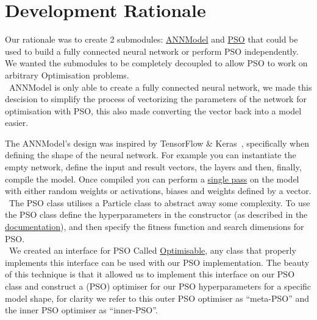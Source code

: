 \documentclass[11pt]{article}
\begin{document}
\section{Development Rationale}
Our rationale was to create 2 submodules: \href{https://www2.macs.hw.ac.uk/~sf52/Bio-Comp-docs/html/Coursework.ANNModel.html}{ANNModel} and \href{https://www2.macs.hw.ac.uk/~sf52/Bio-Comp-docs/html/Coursework.PSO.html}{PSO} that could be used to build a fully connected neural network or perform PSO independently.
We wanted the submodules to be completely decoupled to allow PSO to work on arbitrary Optimisation problems.\\

\noindent~ANNModel is only able to create a fully connected neural network, we made this descision to simplify the process of vectorizing the parameters of the network for optimisation with PSO, this also made converting the vector back into a model easier.

The ANNModel’s design was inspired by TensorFlow \& Keras~\autocite{kerasKerasDocumentationModel,tensorflowModuleTfKeras}, specifically when defining the shape of the neural network. For example you can instantiate the empty network, define the input and result vectors, the layers and then, finally, compile the model.
Once compiled you can perform a \href{https://www2.macs.hw.ac.uk/~sf52/Bio-Comp-docs/html/Coursework.ANNModel.html?highlight=one_pass#Coursework.ANNModel.model.ANN.one_pass}{single pass} on the model with either random weights or activations, biases and weights defined by a vector.\\

\noindent~The PSO class utilises a Particle class to abstract away some complexity.
To use the PSO class define the hyperparameters in the constructor (as described in the \href{https://www2.macs.hw.ac.uk/~sf52/Bio-Comp-docs/html/Coursework.PSO.html?highlight=pso#Coursework.PSO.pswarm.PSO}{documentation}), and then specify the fitness function and search dimensions for PSO. \\

\noindent~We created an interface for PSO Called \href{https://www2.macs.hw.ac.uk/~sf52/Bio-Comp-docs/html/Coursework.PSO.html?highlight=optimisable#Coursework.PSO.interface.Optimisable}{Optimisable}, any class that properly implements this interface can be used with our PSO implementation. 
The beauty of this technique is that it allowed us to implement this interface on our PSO class and construct a (PSO) optimiser for our PSO hyperparameters for a specific model shape, for clarity we refer to this outer PSO optimiser as ``meta-PSO'' and the inner PSO optimiser as ``inner-PSO''.
\end{document}
